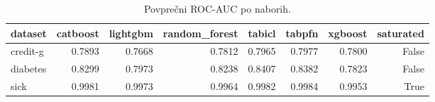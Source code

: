 \begin{table}[htbp]
\centering
\caption{Povprečni ROC-AUC po naborih.}
\label{tab:pivot}
\begin{tabular}{lrrrrrrr}
\hline
dataset & catboost & lightgbm & random\_forest & tabicl & tabpfn & xgboost & saturated \\
\hline
credit-g & 0.7893 & 0.7668 & 0.7812 & 0.7965 & 0.7977 & 0.7800 & False \\
diabetes & 0.8299 & 0.7973 & 0.8238 & 0.8407 & 0.8382 & 0.7823 & False \\
sick & 0.9981 & 0.9973 & 0.9964 & 0.9982 & 0.9984 & 0.9953 & True \\
\hline
\end{tabular}
\end{table}
